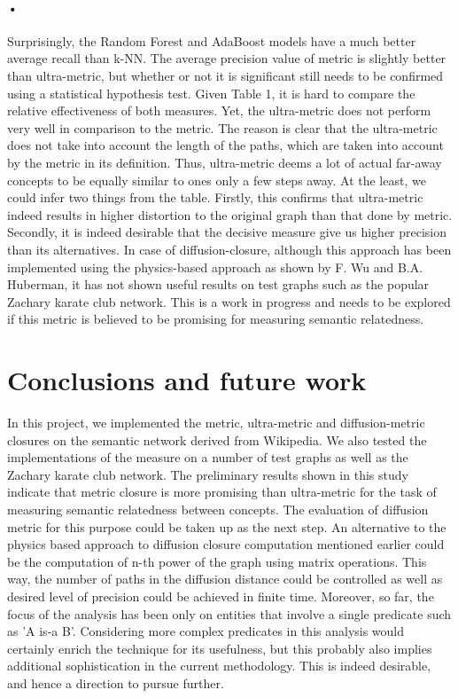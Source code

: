 \documentclass[12pt]{article}
\begin{document}
\paragraph{•}
Surprisingly, the Random Forest and AdaBoost models have a much better average recall than k-NN. The average precision value of metric is slightly better than ultra-metric, but whether or not it is significant still needs to be confirmed using a statistical hypothesis test. Given Table 1, it is hard to compare the relative effectiveness of both measures. Yet, the ultra-metric does not perform very well in comparison to the metric. The reason is clear that the ultra-metric does not take into account the length of the paths, which are taken into account by the metric in its definition. Thus, ultra-metric deems a lot of actual far-away concepts to be equally similar to ones only a few steps away. At the least, we could infer two things from the table. Firstly, this confirms that ultra-metric indeed results in higher distortion to the original graph than that done by metric. Secondly, it is indeed desirable that the decisive measure give us higher precision than its alternatives. In case of diffusion-closure, although this approach has been implemented using the physics-based approach as shown by F. Wu and B.A. Huberman, it has not shown useful results on test graphs such as the popular Zachary karate club network. This is a work in progress and needs to be explored if this metric is believed to be promising for measuring semantic relatedness.

\section{Conclusions and future work}
In this project, we implemented the metric, ultra-metric and diffusion-metric closures on the semantic network derived from Wikipedia. We also tested the implementations of the measure on a number of test graphs as well as the Zachary karate club network. The preliminary results shown in this study indicate that metric closure is more promising than ultra-metric for the task of measuring semantic relatedness between concepts. The evaluation of diffusion metric for this purpose could be taken up as the next step. An alternative to the physics based approach to diffusion closure computation mentioned earlier could be the computation of n-th power of the graph using matrix operations. This way, the number of paths in the diffusion distance could be controlled as well as desired level of precision could be achieved in finite time. Moreover, so far, the focus of the analysis has been only on entities that involve a single predicate such as 'A is-a B'. Considering more complex predicates in this analysis would certainly enrich the technique for its usefulness, but this probably also implies additional sophistication in the current methodology. This is indeed desirable, and hence a direction to pursue further.
\end{document}
